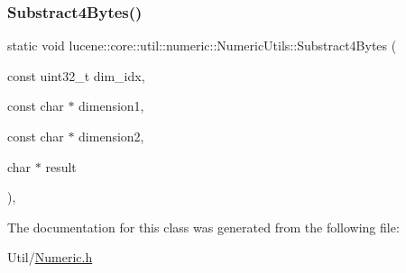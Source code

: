 \mbox{\label{classlucene_1_1core_1_1util_1_1numeric_1_1NumericUtils_adc8172d03864cf97fc6a266fdb425773}} 
\subsubsection{\texorpdfstring{Substract4\+Bytes()}{Substract4Bytes()}}
{\footnotesize\ttfamily static void lucene\+::core\+::util\+::numeric\+::\+Numeric\+Utils\+::\+Substract4\+Bytes (\begin{DoxyParamCaption}\item[{const uint32\+\_\+t}]{dim\+\_\+idx,  }\item[{const char $\ast$}]{dimension1,  }\item[{const char $\ast$}]{dimension2,  }\item[{char $\ast$}]{result }\end{DoxyParamCaption})\hspace{0.3cm}{\ttfamily [inline]}, {\ttfamily [static]}}



The documentation for this class was generated from the following file\+:\begin{DoxyCompactItemize}
\item 
Util/\mbox{\hyperlink{Numeric_8h}{Numeric.\+h}}\end{DoxyCompactItemize}
